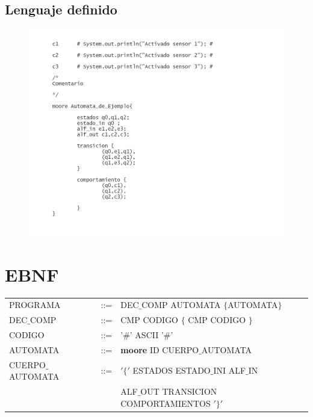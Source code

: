 \documentclass[12pt,a4paper]{article}
\begin{document}
{	\subsection{Lenguaje definido}
	\begin{center}
\begin{figure}[h]
	\centering
	\includegraphics[width=0.8\linewidth]{img/ejemplo}
	\caption{}
	\label{fig:aut}
\end{figure}

	\end{center}
	
	

	\newpage
	\section{EBNF}
			\begin{center}
			\begin{tabular}{lcl}
	

				PROGRAMA & ::= & DEC$\_$COMP AUTOMATA $\{$AUTOMATA$\}$ \\ 
				 
				
				DEC$\_$COMP & ::= &CMP  CODIGO $\{$ CMP CODIGO $\}$ \\ 
			
				CODIGO 	&::= &'$\#$' ASCII '$\#$' \\ 
				
				AUTOMATA & ::= & \textbf{moore} ID CUERPO$\_$AUTOMATA \\
				
			
				CUERPO$\_$AUTOMATA	& ::= & $'\{'$ ESTADOS ESTADO$\_$INI ALF$\_$IN  \\ 
				
					& &  ALF$\_$OUT TRANSICION COMPORTAMIENTOS $'\}'$ \\ 
				

\end{tabular}
\end{center}}
\end{document}
